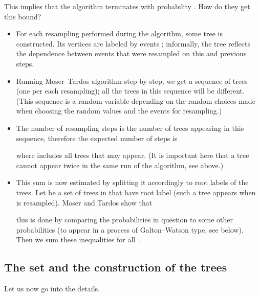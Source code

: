 \documentclass[12pt]{article}
\begin{document}
This implies that the algorithm terminates with probability . How do they get this bound?

\begin{itemize}

\item For each resampling performed during the algorithm, some tree is constructed. Its vertices are labeled by events ; informally, the tree reflects the dependence between events that were resampled on this and previous steps.

\item Running Moser--Tardos algorithm step by step, we get a sequence of trees (one per each resampling); all the trees in this sequence will be different. (This sequence is a random variable depending on the random choices made when choosing the random values and the events for resampling.)

\item The number of resampling steps is the number of trees appearing in this sequence, therefore the expected number of steps is

where  includes all trees that may appear. (It is important here that a tree cannot appear twice in the same run of the algorithm, see above.)

\item This sum is now estimated by splitting it accordingly to root labels of the trees. Let  be a set of trees in  that have root label  (such a tree appears when  is resampled). Moser and Tardos show that

this is done by comparing the probabilities in question to some other probabilities (to appear in a process of Galton--Watson type, see below). Then we sum these inequalities for all~.
\end{itemize}

\subsection{The set  and the construction of the trees}

Let us now go into the details.
\end{document}
